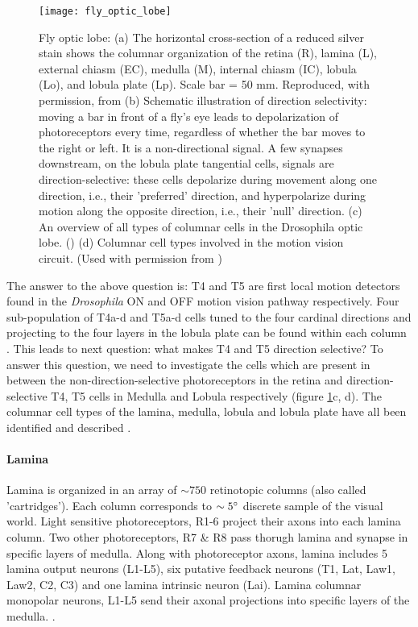 \begin{figure}
\centering
\hspace*{-1cm} 
\texttt{[image: fly\_optic\_lobe]}
\caption[Fly optic lobe] {Fly optic lobe: (a) The horizontal cross-section of a reduced silver stain shows the columnar organization of the retina (R), lamina (L), external chiasm (EC), medulla (M), internal chiasm (IC), lobula (Lo), and lobula plate (Lp). Scale bar = 50 mm. Reproduced, with permission, from \cite{Takemura2008} (b) Schematic illustration of direction selectivity: moving a bar in front of a fly's eye leads to depolarization of photoreceptors every time, regardless of whether the bar moves to the right or left. It is a non-directional signal. A few synapses downstream, on the lobula plate tangential cells, signals are direction-selective: these cells depolarize during movement along one direction, i.e., their 'preferred' direction, and hyperpolarize during motion along the opposite direction, i.e., their 'null' direction. (c) An overview of all types of columnar cells in the Drosophila optic lobe. (\cite{Fischbach1989}) (d) Columnar cell types involved in the motion vision circuit. (Used with permission from \cite{Borst2020, Borst2020b})}
\label{fig:opticlobe}
\end{figure}

The answer to the above question is: T4 and T5 are first local motion detectors found in the \textit{Drosophila} ON and OFF motion vision pathway respectively. Four sub-population of T4a-d and T5a-d cells tuned to the four cardinal directions and projecting to the four layers in the lobula plate can be found within each column \parencite{Maisak2013}. This leads to next question: what makes T4 and T5 direction selective? To answer this question, we need to investigate the cells which are present in between the non-direction-selective photoreceptors in the retina and direction-selective T4, T5 cells in Medulla and Lobula respectively (figure \ref{fig:opticlobe}c, d). The columnar cell types of the lamina, medulla, lobula and lobula plate have all been identified and described \parencite{Fischbach1989, RamonyCajal1915}.  

\paragraph{Lamina}
Lamina is organized in an array of $\sim 750$ retinotopic columns (also called 'cartridges'). Each column corresponds to $\sim 5\degree$ discrete sample of the visual world. Light sensitive photoreceptors, R1-6 project their axons into each lamina column. Two other photoreceptors, R7 \& R8 pass thorugh lamina and synapse in specific layers of medulla. Along with photoreceptor axons, lamina includes 5 lamina output neurons (L1-L5), six putative feedback neurons (T1, Lat, Law1, Law2, C2, C3) and one lamina intrinsic neuron (Lai). Lamina columnar monopolar neurons, L1-L5 send their axonal projections into specific layers of the medulla. \parencite{Fischbach1989, Tuthill2013}. 

